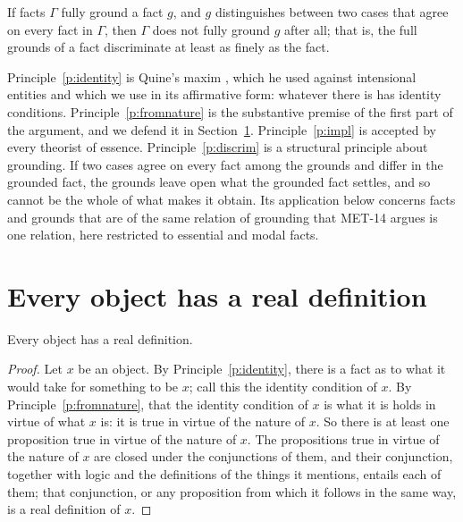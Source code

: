 \documentclass{situationist-preprint}
\begin{document}
\begin{principle}[Discrimination]\label{p:discrim}
If facts $\Gamma$ fully ground a fact $g$, and $g$ distinguishes between two cases that agree on every fact in $\Gamma$, then $\Gamma$ does not fully ground $g$ after all; that is, the full grounds of a fact discriminate at least as finely as the fact.
\end{principle}

Principle~\ref{p:identity} is Quine's maxim \citep{Quine1969}, which he used against intensional entities and which we use in its affirmative form: whatever there is has identity conditions. Principle~\ref{p:fromnature} is the substantive premise of the first part of the argument, and we defend it in Section~\ref{s:realdef}. Principle~\ref{p:impl} is accepted by every theorist of essence. Principle~\ref{p:discrim} is a structural principle about grounding. If two cases agree on every fact among the grounds and differ in the grounded fact, the grounds leave open what the grounded fact settles, and so cannot be the whole of what makes it obtain. Its application below concerns facts and grounds that are of the same relation of grounding that MET-14 argues is one relation, here restricted to essential and modal facts.

\section{Every object has a real definition}\label{s:realdef}

\begin{proposition}\label{p:realdef}
Every object has a real definition.
\end{proposition}

\begin{proof}
Let $x$ be an object. By Principle~\ref{p:identity}, there is a fact as to what it would take for something to be $x$; call this the identity condition of $x$. By Principle~\ref{p:fromnature}, that the identity condition of $x$ is what it is holds in virtue of what $x$ is: it is true in virtue of the nature of $x$. So there is at least one proposition true in virtue of the nature of $x$. The propositions true in virtue of the nature of $x$ are closed under the conjunctions of them, and their conjunction, together with logic and the definitions of the things it mentions, entails each of them; that conjunction, or any proposition from which it follows in the same way, is a real definition of $x$.
\end{proof}
\end{document}
